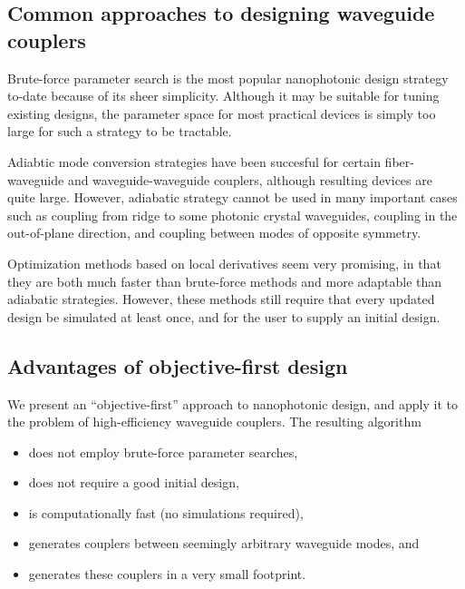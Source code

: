 \documentclass[letterpaper,10pt]{article}
\begin{document}
\subsection{Common approaches to designing waveguide couplers}
Brute-force parameter search is the most popular nanophotonic design strategy 
    to-date because of its sheer simplicity\cite{}.
Although it may be suitable for tuning existing designs\cite{},
    the parameter space for most practical devices is simply too large
    for such a strategy to be tractable.

Adiabtic mode conversion strategies have been succesful
    for certain fiber-waveguide\cite{} and waveguide-waveguide\cite{} couplers,
    although resulting devices are quite large.
However, adiabatic strategy cannot be used in many important cases such as
    coupling from ridge to some photonic crystal waveguides,
    coupling in the out-of-plane direction, and
    coupling between modes of opposite symmetry.

Optimization methods based on local derivatives seem very promising\cite{},
    in that they are both much faster than brute-force methods and
    more adaptable than adiabatic strategies.
However, these methods still require that every updated design be simulated
    at least once,
    and for the user to supply an initial design.


\subsection{Advantages of objective-first design}
We present an ``objective-first'' approach to nanophotonic design, 
    and apply it to the problem of high-efficiency waveguide couplers.
The resulting algorithm
\begin{itemize}
    \item does not employ brute-force parameter searches,
    \item does not require a good initial design,
    \item is computationally fast (no simulations required),
    \item generates couplers between seemingly arbitrary waveguide modes, and
    \item generates these couplers in a very small footprint. 
\end{itemize}
\end{document}
